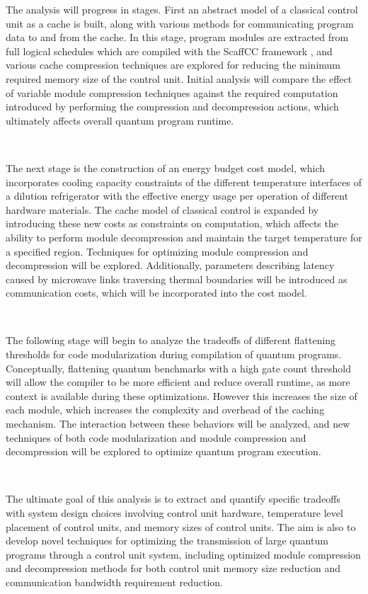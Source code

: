 The analysis will progress in stages. First an abstract model of a classical control unit as a cache is built, along with various methods for communicating program data to and from the cache. In this stage, program modules are extracted from full logical schedules which are compiled with the ScaffCC framework \cite{scaff}, and various cache compression techniques are explored for reducing the minimum required memory size of the control unit. Initial analysis will compare the effect of variable module compression techniques against the required computation introduced by performing the compression and decompression actions, which ultimately affects overall quantum program runtime. \par ~\par 
	The next stage is the construction of an energy budget cost model, which incorporates cooling capacity constraints of the different temperature interfaces of a dilution refrigerator with the effective energy usage per operation of different hardware materials. The cache model of classical control is expanded by introducing these new costs as constraints on computation, which affects the ability to perform module decompression and maintain the target temperature for a specified region. Techniques for optimizing module compression and decompression will be explored. Additionally, parameters describing latency caused by microwave links traversing thermal boundaries will be introduced as communication costs, which will be incorporated into the cost model.\par ~\par
	The following stage will begin to analyze the tradeoffs of different flattening thresholds for code modularization during compilation of quantum programs. Conceptually, flattening quantum benchmarks with a high gate count threshold will allow the compiler to be more efficient and reduce overall runtime, as more context is available during these optimizations. However this increases the size of each module, which increases the complexity and overhead of the caching mechanism. The interaction between these behaviors will be analyzed, and new techniques of both code modularization and module compression and decompression will be explored to optimize quantum program execution.\par ~\par 
		The ultimate goal of this analysis is to extract and quantify specific tradeoffs with system design choices involving control unit hardware, temperature level placement of control units, and memory sizes of control units. The aim is also to develop novel techniques for optimizing the transmission of large quantum programs through a control unit system, including optimized module compression and decompression methods for both control unit memory size reduction and communication bandwidth requirement reduction. 

